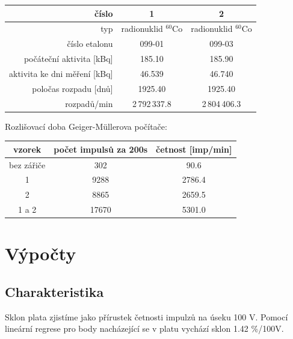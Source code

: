 \documentclass[11pt]{article}
\begin{document}
\begin{center}
\begin{tabular}{|r|c|c|}
\hline
číslo & 1 & 2 \\
\hline
typ   & radionuklid $^{60}$Co & radionuklid $^{60}$Co \\
číslo etalonu & 099-01 & 099-03 \\
počáteční aktivita [kBq] & 185.10 & 185.90 \\
aktivita ke dni měření [kBq] & 46.539 & 46.740 \\
poločas rozpadu [dnů] & 1925.40 & 1925.40 \\
rozpadů/min & 2\,792\,337.8 & 2\,804\,406.3 \\
\hline
\end{tabular}
\end{center}

\vspace{.5cm}
\noindent
Rozlišovací doba Geiger-M\"ullerova počítače:

\begin{center}
\begin{tabular}{|c|c|c|}
\hline
vzorek & počet impulsů za 200s & četnost [imp/min] \\
\hline
bez zářiče & 302 & 90.6 \\
1      & 9288  & 2786.4 \\
2      & 8865  & 2659.5 \\
1 a 2  & 17670 & 5301.0 \\
\hline
\end{tabular}
\end{center}


\section{Výpočty}
\subsection{Charakteristika}
Sklon plata zjistíme jako přírustek četnosti impulzů na úseku 100 V.  Pomocí
lineární regrese pro body nacházející se v platu vychází sklon 1.42 \%/100V.
\end{document}
